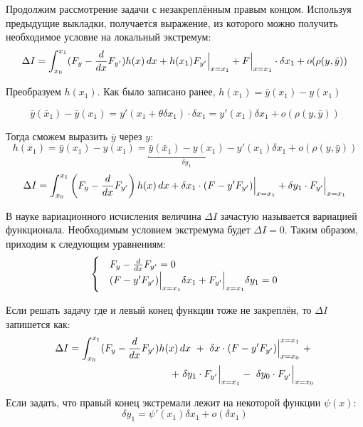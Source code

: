 \documentclass[12pt]{article}
\begin{document}
	Продолжим рассмотрение задачи с незакреплённым правым концом. Используя предыдущие выкладки, получается 
	выражение, из которого можно получить необходимое условие на локальный экстремум:
	$$\Delta I = \int_{x_0}^{x_1} (F_y - \frac{d}{dx} F_{y'})h(x)\,dx + h(x_1)F_{y'}\Big|_{x=x_1}^{} + 
	  F\Big|_{x=x_1}^{}\cdot \delta x_1 + o(\rho(y,\tilde{y}))$$
	  
	Преобразуем $h(x_1)$. Как было записано ранее, $h(x_1) = \bar{y}(x_1) - y(x_1)$
	
	$$\bar{y}(\bar{x}_1) - \bar{y}(x_1) = y'(x_1 + \theta \delta x_1)\cdot \delta x_1 
	= y'(x_1) \delta x_1 + o(\rho(y, \bar{y}))$$
	
	Тогда сможем выразить $\bar{y}$ через $y$:
	$$h(x_1) = \bar{y}(x_1) - y(x_1) = \underbracket{\bar{y}(\bar{x}_1) - y(x_1)}_{\delta y_1}
	  - y'(x_1)\delta x_1 + o(\rho(y, \bar{y}))$$
	\begin{align*}
		\Delta I = \int_{x_0}^{x_1} \left(F_y - \frac{d}{dx}F_{y'}\right)h(x)\,dx
		+ \delta x_1\cdot(F - y'F_{y'}) \Big|_{x=x_1}^{}
		+ \delta y_1 \cdot F_{y'}\Big|_{x=x_1}^{}
	\end{align*}
	
	В науке вариационного исчисления величина $\Delta I$ зачастую называется вариацией функционала. Необходимым условием 
	экстремума будет $\Delta I = 0$. Таким образом, приходим к следующим уравнениям:
	\begin{equation}
	\label{eq:preTraversal}
	\begin{cases}
		&F_y - \frac{d}{dx} F_{y'} = 0 \\
		&(F - y'F_{y'})\Big|_{x = x_1}^{} \delta x_1 + F_{y'} \Big|_{x=x_1}^{}\delta y_1 = 0
	\end{cases} 
	\end{equation}
	
	 Если решать задачу где и левый конец функции тоже не закреплён, то $\Delta I$ запишется как:
	\begin{align*}
		\Delta I = \int_{x_0}^{x_1} (F_y - \frac{d}{dx}F_{y'})h(x)\,dx~+~ 
		\delta x\cdot(F - y'F_{y'})\Big|_{x = x_0}^{x = x_1}~+~ \\
		~+~\delta y_1 \cdot F_{y'} \Big|_{x=x_1}^{}-~\delta y_0 \cdot F_{y'} \Big|_{x=x_0}^{}
	\end{align*}
	

	Если задать, что правый конец экстремали лежит на некоторой функции $\psi(x)$:
	$$\delta y_1 = \psi'(x_1) \delta x_1 + o(\delta x_1)$$
	
\end{document}
